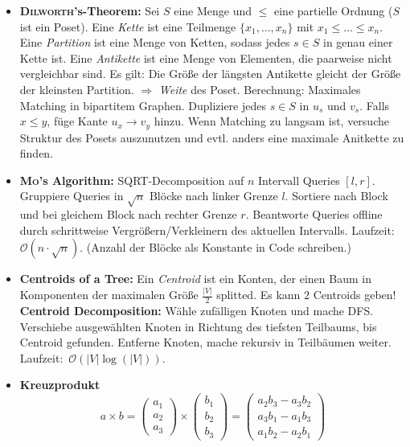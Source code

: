 \begin{itemize}
	\item \textbf{\textsc{Dilworth}'s-Theorem:}
	Sei $S$ eine Menge und $\leq$ eine partielle Ordnung ($S$ ist ein Poset).
	Eine \emph{Kette} ist eine Teilmenge $\{x_1,\ldots,x_n\}$ mit $x_1 \leq \ldots \leq x_n$.
	Eine \emph{Partition} ist eine Menge von Ketten, sodass jedes $s \in S$ in genau einer Kette ist.
	Eine \emph{Antikette} ist eine Menge von Elementen, die paarweise nicht vergleichbar sind.
	\newline
	Es gilt: Die Größe der längsten Antikette gleicht der Größe der kleinsten Partition.
	$\Rightarrow$ \emph{Weite} des Poset.
	\newline
	Berechnung: Maximales Matching in bipartitem Graphen.
	Dupliziere jedes $s \in S$ in $u_s$ und $v_s$.
	Falls $x \leq y$, füge Kante $u_x \to v_y$ hinzu.
	Wenn Matching zu langsam ist, versuche Struktur des Posets auszunutzen und evtl. anders eine maximale Anitkette zu finden.

	\item \textbf{\textsc{Mo}'s Algorithm:}
	SQRT-Decomposition auf $n$ Intervall Queries $[l,r]$.
	Gruppiere Queries in $\sqrt{n}$ Blöcke nach linker Grenze $l$.
	Sortiere nach Block und bei gleichem Block nach rechter Grenze $r$.
	Beantworte Queries offline durch schrittweise Vergrößern/Verkleinern des aktuellen Intervalls.
	Laufzeit:~$\mathcal{O}(n\cdot\sqrt{n})$.
	(Anzahl der Blöcke als Konstante in Code schreiben.)

	\item \textbf{Centroids of a Tree:}
	Ein \emph{Centroid} ist ein Konten, der einen Baum in Komponenten der maximalen Größe $\frac{\vert V \vert}{2}$ splitted.
	Es kann $2$ Centroids geben!
	\textbf{Centroid Decomposition:}
	Wähle zufälligen Knoten und mache DFS.
	Verschiebe ausgewählten Knoten in Richtung des tiefsten Teilbaums, bis Centroid gefunden. Entferne Knoten, mache rekursiv in Teilbäumen weiter. Laufzeit:~$\mathcal{O}(\vert V \vert \log(\vert V \vert))$.

	\item \textbf{Kreuzprodukt}
	\[
		a \times b =
		\begin{pmatrix}
			a_1 \\
			a_2 \\
			a_3
		\end{pmatrix}
		\times
		\begin{pmatrix}
			b_1 \\
			b_2 \\
			b_3
		\end{pmatrix}
		=
		\begin{pmatrix}
				a_2b_3 - a_3b_2 \\
				a_3b_1 - a_1b_3 \\
				a_1b_2 - a_2b_1
		\end{pmatrix}
	\]
\end{itemize}

